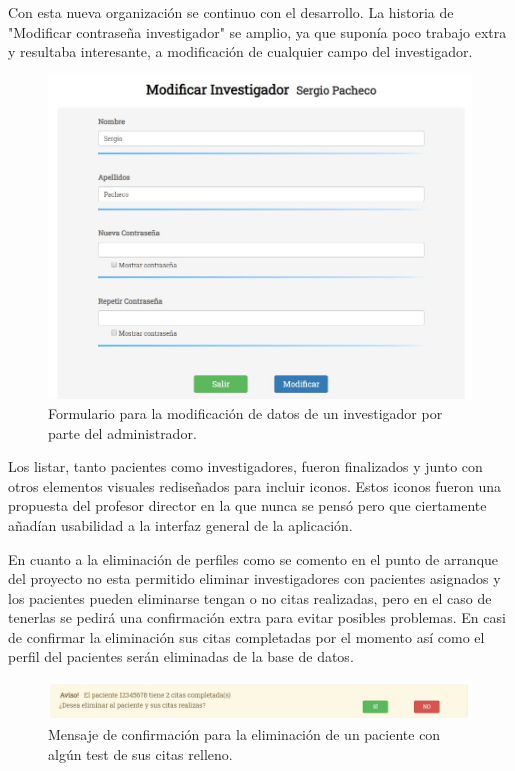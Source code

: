 \newpage

Con esta nueva organización se continuo con el desarrollo. La historia de "Modificar contraseña investigador" se amplio, ya que suponía poco trabajo extra y resultaba interesante, a modificación de cualquier campo del investigador.

\begin{figure}[h]
    \centering
     \includegraphics[width=1\textwidth]{images/modificarInvestigador.jpg}
    \caption{Formulario para la modificación de datos de un investigador por parte del administrador.}
\end{figure}

Los listar, tanto pacientes como investigadores, fueron finalizados y junto con otros elementos visuales rediseñados para incluir iconos. Estos iconos fueron una propuesta del profesor director en la que nunca se pensó pero que ciertamente añadían usabilidad a la interfaz general de la aplicación.\newline

En cuanto a la eliminación de perfiles como se comento en el punto de arranque del proyecto no esta permitido eliminar investigadores con pacientes asignados y los pacientes pueden eliminarse tengan o no citas realizadas, pero en el caso de tenerlas se pedirá una confirmación extra para evitar posibles problemas. En casi de confirmar la eliminación sus citas completadas por el momento así como el perfil del pacientes serán eliminadas de la base de datos.

\begin{figure}[h]
    \centering
     \includegraphics[width=1\textwidth]{images/confirmacionEliminarPaciente.jpg}
    \caption{Mensaje de confirmación para la eliminación de un paciente con algún test de sus citas relleno.}
\end{figure}
\newpage

